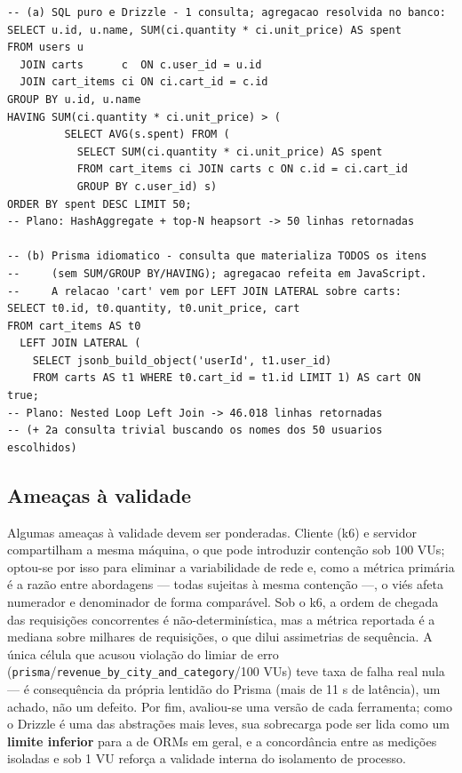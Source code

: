 \documentclass[12pt]{article}
\begin{document}
{\scriptsize
\begin{verbatim}
-- (a) SQL puro e Drizzle - 1 consulta; agregacao resolvida no banco:
SELECT u.id, u.name, SUM(ci.quantity * ci.unit_price) AS spent
FROM users u
  JOIN carts      c  ON c.user_id = u.id
  JOIN cart_items ci ON ci.cart_id = c.id
GROUP BY u.id, u.name
HAVING SUM(ci.quantity * ci.unit_price) > (
         SELECT AVG(s.spent) FROM (
           SELECT SUM(ci.quantity * ci.unit_price) AS spent
           FROM cart_items ci JOIN carts c ON c.id = ci.cart_id
           GROUP BY c.user_id) s)
ORDER BY spent DESC LIMIT 50;
-- Plano: HashAggregate + top-N heapsort -> 50 linhas retornadas

-- (b) Prisma idiomatico - consulta que materializa TODOS os itens
--     (sem SUM/GROUP BY/HAVING); agregacao refeita em JavaScript.
--     A relacao 'cart' vem por LEFT JOIN LATERAL sobre carts:
SELECT t0.id, t0.quantity, t0.unit_price, cart
FROM cart_items AS t0
  LEFT JOIN LATERAL (
    SELECT jsonb_build_object('userId', t1.user_id)
    FROM carts AS t1 WHERE t0.cart_id = t1.id LIMIT 1) AS cart ON true;
-- Plano: Nested Loop Left Join -> 46.018 linhas retornadas
-- (+ 2a consulta trivial buscando os nomes dos 50 usuarios escolhidos)
\end{verbatim}
}


\vspace{6pt}

\subsection{Ameaças à validade}

Algumas ameaças à validade devem ser ponderadas. Cliente (k6) e servidor
compartilham a mesma máquina, o que pode introduzir contenção sob 100
VUs; optou-se por isso para eliminar a variabilidade de rede e, como a
métrica primária é a razão entre abordagens --- todas sujeitas à mesma
contenção ---, o viés afeta numerador e denominador de forma comparável.
Sob o k6, a ordem de chegada das requisições concorrentes é
não-determinística, mas a métrica reportada é a mediana sobre milhares de
requisições, o que dilui assimetrias de sequência. A única célula que
acusou violação do limiar de erro
(\texttt{prisma}/\texttt{revenue\_by\_city\_and\_category}/100 VUs) teve
taxa de falha real nula --- é consequência da própria lentidão do Prisma
(mais de 11 s de latência), um achado, não um defeito. Por fim, avaliou-se
uma versão de cada ferramenta; como o Drizzle é uma das abstrações mais
leves, sua sobrecarga pode ser lida como um \textbf{limite inferior} para
a de ORMs em geral, e a concordância entre as medições isoladas e sob 1 VU
reforça a validade interna do isolamento de processo.
\end{document}
